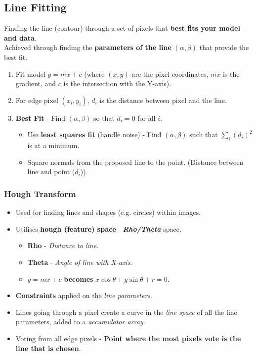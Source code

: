 \documentclass[english, 10pt]{article}
\begin{document}
\subsection{Line Fitting}

  Finding the line (contour) through a set of pixels that \textbf{best fits your model and data}.\\
  
  Achieved through finding the \textbf{parameters of the line} $(\alpha, \beta)$ that provide the best fit. 
  
  \begin{enumerate}
\item Fit model $y = mx + c$ (where $(x,y)$ are the pixel coordinates, $mx$ is the gradient, and $c$ is the intersection with the Y-axis).
\item For edge pixel $(x_i, y_i)$, $d_i$ is the distance between pixel and the line. 
\item \textbf{Best Fit} - Find  $(\alpha, \beta)$ so that $d_i = 0$ for all $i$.
\begin{itemize}
\item Use \textbf{least squares fit} (handle noise) - Find $(\alpha, \beta)$ such that $\sum _i(d_i)^2$ is at a minimum.
\item Square normals from the proposed line to the point. (Distance between line and point ($d_i$)).
\end{itemize}
\end{enumerate}
    
\subsubsection{Hough Transform}

\begin{itemize}
\item Used for finding lines and shapes (e.g. circles) within images. 
\item Utilises \textbf{hough (feature) space} - \textit{\textbf{Rho/Theta}} space.
\begin{itemize}
\item \textbf{Rho} - \textit{Distance to line}.
\item \textbf{Theta} - \textit{Angle of line with X-axis}.
\item $y = mx + c$ \textbf{becomes} $x\cos \theta + y \sin \theta + r = 0$.
\end{itemize}
\item  \textbf{Constraints} applied on the \textit{line parameters}.
\item Lines going through a pixel create a curve in the \emph{line space} of all the line parameters, added to a \emph{accumulator array}.
\item  Voting from all edge pixels - \textbf{Point where the most pixels vote is the line that is chosen}.
\end{itemize}
\end{document}
